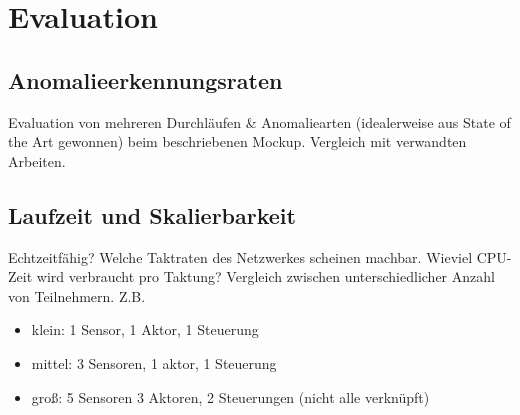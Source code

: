 \chapter{Evaluation}
\section{Anomalieerkennungsraten}
Evaluation von mehreren Durchläufen \& Anomaliearten (idealerweise aus State of the Art gewonnen) beim beschriebenen Mockup. Vergleich mit verwandten Arbeiten.
\section{Laufzeit und Skalierbarkeit}
Echtzeitfähig? Welche Taktraten des Netzwerkes scheinen machbar. Wieviel CPU-Zeit wird verbraucht pro Taktung? Vergleich zwischen unterschiedlicher Anzahl von Teilnehmern. Z.B.
\begin{itemize}
\item klein: 1 Sensor, 1 Aktor, 1 Steuerung
\item mittel: 3 Sensoren, 1 aktor, 1 Steuerung
\item groß: 5 Sensoren 3 Aktoren, 2 Steuerungen (nicht alle verknüpft)
\end{itemize}